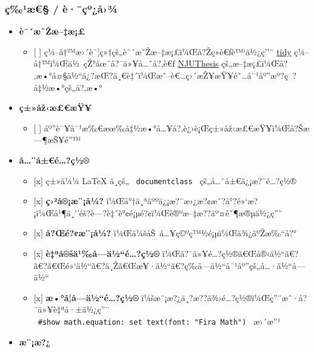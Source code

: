 
\subsubsection{ç‰¹æ€§ /
è·¯çº¿å›¾}\label{uxe7uxb9uxe6-uxe8uxe7uxbauxe5uxbe}

\begin{itemize}
\tightlist
\item
  \textbf{è¯´æ˜Žæ--‡æ¡£}

  \begin{itemize}
  \tightlist
  \item
    {[} {]} ç¼--å†™æ›´è¯¦ç»†çš„è¯´æ˜Žæ--‡æ¡£ï¼Œå?Žç»­è€ƒè™`ä½¿ç''¨
    \href{https://github.com/typst/packages/tree/main/packages/preview/tidy/0.1.0}{tidy}
    ç¼--å†™ï¼Œä½~çŽ°åœ¨å?¯ä»¥å\ldots ˆå?‚è€ƒ
    \href{https://mirror-hk.koddos.net/CTAN/macros/unicodetex/latex/njuthesis/njuthesis.pdf}{NJUThesis}
    çš„æ--‡æ¡£ï¼Œå?‚æ•°å¤§ä½``ä¿?æŒ?ä¸€è‡´ï¼Œæˆ--è€\ldots ç›´æŽ¥æŸ¥é˜\ldots å¯¹åº''æº?ç~?å‡½æ•°çš„å?‚æ•°
  \end{itemize}
\item
  \textbf{ç±»åž‹æ£€æŸ¥}

  \begin{itemize}
  \tightlist
  \item
    {[} {]}
    åº''è¯¥å¯¹æ‰€æœ‰å‡½æ•°å\ldots¥å?‚è¿›è¡Œç±»åž‹æ£€æŸ¥ï¼Œå?Šæ---¶æŠ¥é''™
  \end{itemize}
\item
  \textbf{å\ldots¨å±€é\ldots?ç½®}

  \begin{itemize}
  \tightlist
  \item
    {[}x{]} ç±»ä¼¼ LaTeX ä¸­çš„ \texttt{\ documentclass\ }
    çš„å\ldots¨å±€ä¿¡æ?¯é\ldots?ç½®
  \item
    {[}x{]} \textbf{ç›²å®¡æ¨¡å¼?}
    ï¼Œå°†ä¸ªäººä¿¡æ?¯æ›¿æ?¢æˆ?å°?é»`æ?¡ï¼Œå¹¶ä¸''éš?è---?è‡´è°¢é¡µé?¢ï¼Œè®ºæ--‡æ??äº¤é˜¶æ®µä½¿ç''¨
  \item
    {[}x{]} \textbf{å?Œé?¢æ¨¡å¼?}
    ï¼Œä¼šåŠ~å\ldots¥ç©ºç™½é¡µï¼Œä¾¿äºŽæ‰``å?°
  \item
    {[}x{]} \textbf{è‡ªå®šä¹‰å­---ä½``é\ldots?ç½®}
    ï¼Œå?¯ä»¥é\ldots?ç½®ã€Œå®‹ä½``ã€?ã€?ã€Œé»`ä½``ã€?ä¸Žã€Œæ¥·ä½``ã€?ç­‰å­---ä½``å¯¹åº''çš„å\ldots·ä½``å­---ä½``
  \item
    {[}x{]} \textbf{æ•°å­¦å­---ä½``é\ldots?ç½®}
    ï¼šæ¨¡æ?¿ä¸?æ??ä¾›é\ldots?ç½®ï¼Œç''¨æˆ·å?¯ä»¥è‡ªå·±ä½¿ç''¨
    \texttt{\ \#show\ math.equation:\ set\ text(font:\ "Fira\ Math")\ }
    æ›´æ''¹
  \end{itemize}
\item
  \textbf{æ¨¡æ?¿}


\end{itemize}
